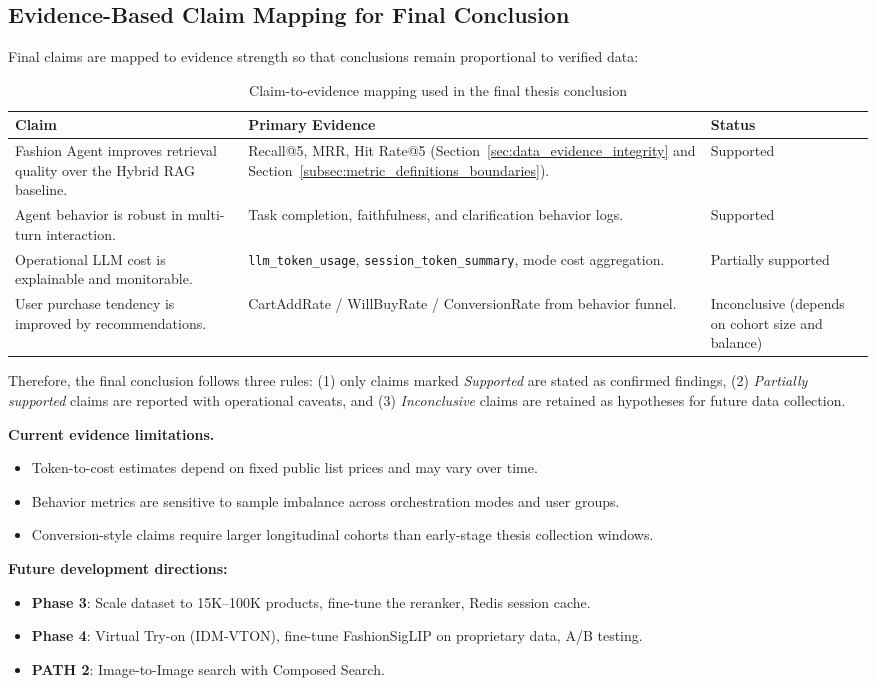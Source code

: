 \subsection{Evidence-Based Claim Mapping for Final Conclusion}
\label{subsec:evidence_claim_mapping}

Final claims are mapped to evidence strength so that conclusions remain proportional to verified data:

\begin{table}[H]
\centering
\begin{tabular}{p{4.0cm}p{5.8cm}p{3.0cm}}
\toprule
\textbf{Claim} & \textbf{Primary Evidence} & \textbf{Status}\\
\midrule
Fashion Agent improves retrieval quality over the Hybrid RAG baseline. & Recall@5, MRR, Hit Rate@5 (Section~\ref{sec:data_evidence_integrity} and Section~\ref{subsec:metric_definitions_boundaries}). & Supported\\
Agent behavior is robust in multi-turn interaction. & Task completion, faithfulness, and clarification behavior logs. & Supported\\
Operational LLM cost is explainable and monitorable. & \texttt{llm\_token\_usage}, \texttt{session\_token\_summary}, mode cost aggregation. & Partially supported\\
User purchase tendency is improved by recommendations. & CartAddRate / WillBuyRate / ConversionRate from behavior funnel. & Inconclusive (depends on cohort size and balance)\\
\bottomrule
\end{tabular}
\caption{Claim-to-evidence mapping used in the final thesis conclusion}
\label{tab:claim_evidence_mapping}
\end{table}

Therefore, the final conclusion follows three rules: (1) only claims marked \textit{Supported} are stated as confirmed findings, (2) \textit{Partially supported} claims are reported with operational caveats, and (3) \textit{Inconclusive} claims are retained as hypotheses for future data collection.

\textbf{Current evidence limitations.}
\begin{itemize}
    \item Token-to-cost estimates depend on fixed public list prices and may vary over time.
    \item Behavior metrics are sensitive to sample imbalance across orchestration modes and user groups.
    \item Conversion-style claims require larger longitudinal cohorts than early-stage thesis collection windows.
\end{itemize}

\textbf{Future development directions:}
\begin{itemize}
    \item \textbf{Phase 3}: Scale dataset to 15K--100K products, fine-tune the reranker, Redis session cache.
    \item \textbf{Phase 4}: Virtual Try-on (IDM-VTON), fine-tune FashionSigLIP on proprietary data, A/B testing.
    \item \textbf{PATH 2}: Image-to-Image search with Composed Search.
\end{itemize}
